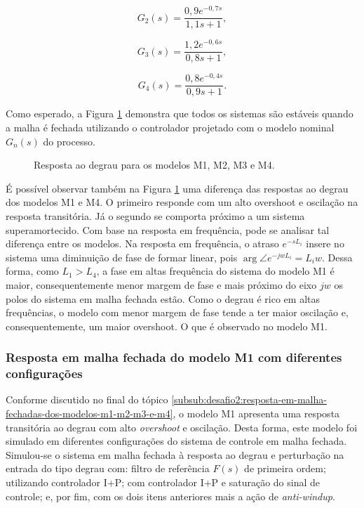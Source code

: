 \begin{equation}
    \label{eq:desafio2:modelo-g2}
    G_{2}(s) = \frac{0,9e^{-0,7s}}{1,1s + 1},
\end{equation}

\begin{equation}
    \label{eq:desafio2:modelo-g3}
    G_{3}(s) = \frac{1,2e^{-0,6s}}{0,8s + 1},
\end{equation}

\begin{equation}
    \label{eq:desafio2:modelo-g4}
    G_{4}(s) = \frac{0,8e^{-0,4s}}{0,9s + 1}.
\end{equation}

Como esperado, a Figura \ref{fig:desafio2:questao5} demonstra que todos os
sistemas são estáveis quando a malha é fechada utilizando o controlador
projetado com o modelo nominal $G_{n}(s)$ do processo.

\begin{figure}[!ht]
    \caption{Resposta ao degrau para os modelos M1, M2, M3 e M4.}
    \vspace{-10pt}
    \hspace{-30pt}
    \label{fig:desafio2:questao5}
    \begin{minipage}{\linewidth}
        
    \end{minipage}
\end{figure}

É possível observar também na Figura \ref{fig:desafio2:questao5} uma diferença
das respostas ao degrau dos modelos M1 e M4. O primeiro responde com um alto
overshoot e oscilação na resposta transitória. Já o segundo se comporta próximo
a um sistema superamortecido. Com base na resposta em frequência, pode se
analisar tal diferença entre os modelos. Na resposta em frequência, o atraso
$e^{-sL_{i}}$ insere no sistema uma diminuição de fase de formar linear, pois
$\arg\angle e^{-jwL_{i}} = L_{i}w$. Dessa forma, como $L_{1} > L_{4}$, a fase em
altas frequência do sistema do modelo M1 é maior, consequentemente menor margem
de fase e mais próximo do eixo $jw$ os polos do sistema em malha fechada estão.
Como o degrau é rico em altas frequências, o modelo com menor margem de fase
tende a ter maior oscilação e, consequentemente, um maior overshoot. O que é
observado no modelo M1.

\subsubsection{Resposta em malha fechada do modelo M1 com diferentes configurações}
Conforme discutido no final do tópico
\ref{subsub:desafio2:resposta-em-malha-fechadas-dos-modelos-m1-m2-m3-e-m4}, o
modelo M1 apresenta uma resposta transitória ao degrau com alto
\textit{overshoot} e oscilação. Desta forma, este modelo foi simulado em
diferentes configurações do sistema de controle em malha fechada. Simulou-se o
sistema em malha fechada à resposta ao degrau e perturbação na entrada do tipo
degrau com: filtro de referência $F(s)$ de primeira ordem; utilizando
controlador I+P; com controlador I+P e saturação do sinal de controle; e, por
fim, com os dois itens anteriores mais a ação de \textit{anti-windup}.

